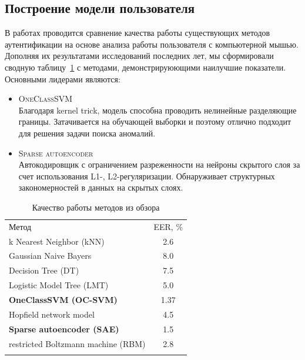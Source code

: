 \documentclass[12pt]{article}
\begin{document}
    \subsection{Построение модели пользователя}
    \label{sec:Overview:Model}

    В работах \cite{Mondal_2, Shen} проводится сравнение качества работы существующих методов аутентификации на основе анализа работы пользователя с компьютерной мышью. Дополняя их результатами исследований последних лет, мы сформировали сводную таблицу~\ref{sec:Overview:Model:table:Result} с методами, демонстрируюющими наилучшие показатели. Основными лидерами являются:

    \begin{itemize}
        \item \textsc{OneClassSVM} \\
        Благодаря kernel trick, модель способна проводить нелинейные разделяющие границы. Затачивается на обучающей выборки и поэтому отлично подходит для решения задачи поиска аномалий.
        \item \textsc{Sparse autoencoder} \\
        Автокодировщик с ограничением разреженности на нейроны скрытого слоя за счет использования L1-, L2-регуляризации. Обнаруживает структурных закономерностей в данных на скрытых слоях.
    \end{itemize}

    \begin{table}[h]
        \centering
        \renewcommand{\arraystretch}{1.5}
        \renewcommand{\tabcolsep}{2mm}
        \caption{Качество работы методов из обзора}
        \begin{tabular}{ || l | c ||}
            \hhline{|t:==:t|} 
            Метод                              & EER, \% \\ [2mm]
            \hhline{|:==:|}
            k Nearest Neighbor (kNN)           & 2.6  \\ \hline
            Gaussian Naive Bayers              & 8.0  \\ \hline
            Decision Tree (DT)                 & 7.5  \\ \hline
            Logistic Model Tree (LMT)          & 5.0  \\ \hline
            \textbf{OneClassSVM (OC-SVM)}      & 1.37 \\ \hline
            Hopfield network model             & 4.5  \\ \hline
            \textbf{Sparse autoencoder (SAE)}  & 1.5  \\ \hline
            restricted Boltzmann machine (RBM) & 2.8  \\
            \hhline{|b:==:b|}
        \end{tabular}
        \label{sec:Overview:Model:table:Result}
    \end{table}
\end{document}
